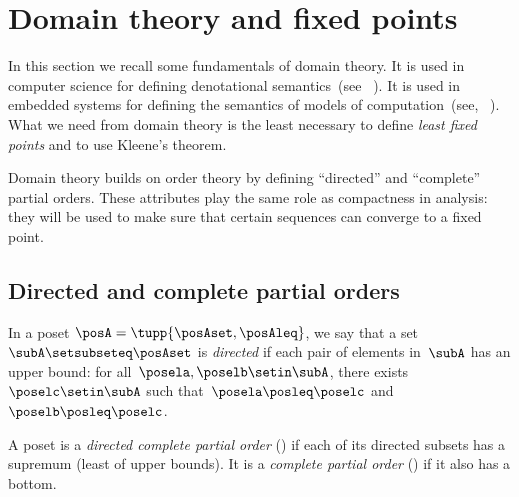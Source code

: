 
\section{Domain theory and fixed points}
\label{sec:Monotonicity-and-fixed}

In this section we recall some fundamentals of domain theory.
It is used in computer science for defining denotational semantics~(see \eg~\cite{manes86}).
It is used in embedded systems for defining the semantics of models of computation~(see, \eg~\cite{lee10}).
What we need from domain theory is the least necessary to define \emph{least fixed points} and to use Kleene's theorem.

Domain theory builds on order theory by defining ``directed'' and ``complete'' partial orders.
These attributes play the same role as compactness in analysis: they will be used to make sure that certain sequences can converge to a fixed point.

\subsection{Directed and complete partial orders}

\begin{definition}
    \label{def:directed-set}
    In a poset $\posA = \tupp{\posAset, \posAleq}$, we say that a set~$\subA\setsubseteq\posAset$ is \emph{directed} if each pair of elements in~$\subA$ has an upper bound: for all~$\posela,\poselb \setin \subA$, there exists~$\poselc\setin \subA$ such that~$\posela\posleq \poselc$ and~$\poselb\posleq \poselc$.
\end{definition}


\begin{definition}[Completeness]
    \label{def:cpo}
    A poset is a \emph{directed complete partial order} (\DCPO) if each of its directed subsets has a supremum (least of upper bounds).
    It is a \emph{complete partial order} (\CPO) if it also has a bottom.
\end{definition}

